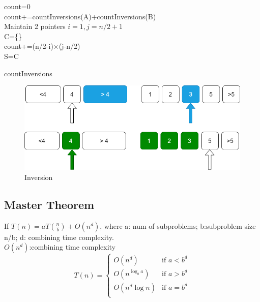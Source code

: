 \begin{algorithm}[H]
    \SetAlgoLined
    count=0\\
    count+=countInversions(A)+countInversions(B)\\
    Maintain 2 pointers $i=1,j=n/2+1$ \\
    C=\{\}\\
    count+=(n/2-i)$\times $(j-n/2)\\
    S=C\\
    \caption{countInversions}
\end{algorithm}
\begin{figure}
    \centering
    \includegraphics[width=0.8\linewidth]{Notes/fig/Inverse.png}
    \caption{Inversion}
    \label{fig:Inversion}
\end{figure}


\subsection{Master Theorem}
\begin{thm}
    If $T(n)=aT(\frac{n}{b})+O(n^d)$, where a: num of subproblems; b:subproblem size n/b; d: combining time complexity.\\
    $O(n^d)$:combining time complexity\\
    \begin{equation}
        T(n)=
        \begin{cases}
            O(n^d) & \text{if } a<b^d\\
            O(n^{\log_b a}) & \text{if } a>b^d \\
            O(n^d \log n) & \text{if } a=b^d\\
        \end{cases}    
    \end{equation}
\end{thm}

